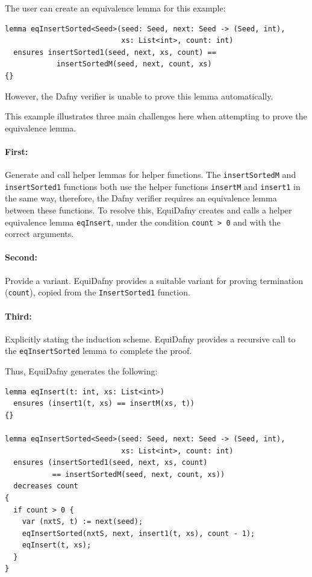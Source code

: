 \documentclass[runningheads]{llncs}
\begin{document}
The user can create an equivalence lemma for this example:
\begin{lstlisting}
lemma eqInsertSorted<Seed>(seed: Seed, next: Seed -> (Seed, int), 
                           xs: List<int>, count: int)
  ensures insertSorted1(seed, next, xs, count) == 
            insertSortedM(seed, next, count, xs)
{}
\end{lstlisting}
%
However, the Dafny verifier is unable to prove this lemma automatically.

This example illustrates three main challenges here when attempting to prove the equivalence lemma. 

\paragraph{First:} Generate and call helper lemmas for helper functions. The \lstinline|insertSortedM| and \lstinline|insertSorted1| functions both use the helper functions \lstinline|insertM| and \lstinline|insert1| in the same way, therefore, the Dafny verifier requires an equivalence lemma between these functions. To resolve this, EquiDafny creates and calls a helper equivalence lemma \lstinline|eqInsert|, under the condition \lstinline|count > 0| and with the correct arguments.
\paragraph{Second:} Provide a variant. EquiDafny provides a suitable variant for proving termination (\lstinline|count|), copied from the \lstinline|InsertSorted1| function.
\paragraph{Third:} Explicitly stating the induction scheme. EquiDafny provides a recursive call to the \lstinline|eqInsertSorted| lemma to complete the proof.

Thus, EquiDafny generates the following: 
\begin{lstlisting}
lemma eqInsert(t: int, xs: List<int>)
  ensures (insert1(t, xs) == insertM(xs, t))
{}

lemma eqInsertSorted<Seed>(seed: Seed, next: Seed -> (Seed, int), 
                           xs: List<int>, count: int)
  ensures (insertSorted1(seed, next, xs, count) 
           == insertSortedM(seed, next, count, xs))
  decreases count
{
  if count > 0 {
    var (nxtS, t) := next(seed);
    eqInsertSorted(nxtS, next, insert1(t, xs), count - 1);
    eqInsert(t, xs);
  }
}
\end{lstlisting}
%
\end{document}
